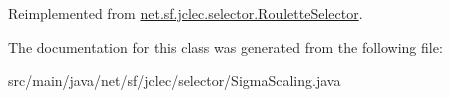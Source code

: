 Reimplemented from \hyperlink{classnet_1_1sf_1_1jclec_1_1selector_1_1_roulette_selector_a1ce03c3e978aadacffd10309c36d82db}{net.\-sf.\-jclec.\-selector.\-Roulette\-Selector}.



The documentation for this class was generated from the following file\-:\begin{DoxyCompactItemize}
\item 
src/main/java/net/sf/jclec/selector/Sigma\-Scaling.\-java\end{DoxyCompactItemize}
